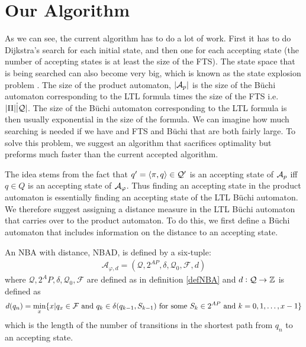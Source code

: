 \newpage
\section{Our Algorithm}
As we can see, the current algorithm has to do a lot of work. First it has to do Dijkstra's search for each initial state, and then one for each accepting state (the number of accepting states is at least the size of the FTS). The state space that is being searched can also become very big, which is known as the state explosion problem \cite{clarke99}. The size of the product automaton, $|\mathcal{A}_p|$ is the size of the B\"{u}chi automaton corresponding to the LTL formula times the size of the FTS i.e.\ $|\Pi| \dot |\mathcal{Q}|$. The size of the B\"{u}chi automaton corresponding to the LTL formula is then usually exponential in the size of the formula. We can imagine how much searching is needed if we have and FTS and B\"{u}chi that are both fairly large. To solve this problem, we suggest an algorithm that sacrifices optimality but preforms much faster than the current accepted algorithm. 

The idea stems from the fact that $q' = \langle \pi, q \rangle \in \mathcal{Q}'$ is an accepting state of $\mathcal{A}_p$ iff $q \in Q$ is an accepting state of $\mathcal{A}_\varphi$. Thus finding an accepting state in the product automaton is essentially finding an accepting state of the LTL B\"{u}chi automaton. We therefore suggest assigning a distance measure in the LTL B\"{u}chi automaton that carries over to the product automaton. To do this, we first define a B\"{u}chi automaton that includes information on the distance to an accepting state.

\begin{definition}
\label{defBWD}
An NBA with distance, NBAD, is defined by a six-tuple:
\begin{align*}
\mathcal{A}_{\varphi,d} = (\mathcal{Q},2^{AP},\delta,\mathcal{Q}_0,\mathcal{F},d)
\end{align*}
where $\mathcal{Q},2^AP,\delta,\mathcal{Q}_0,\mathcal{F}$ are defined as in definition \ref{defNBA} and $d:\mathcal{Q} \rightarrow \mathbb{Z}$ is defined as 
\begin{align*}
d(q_n) = \min_x \{x | q_x \in \mathcal{F} \text{ and } q_k \in \delta(q_{k-1},S_{k-1}) \text{ for some } S_k \in 2^{AP} \text{ and } k = 0,1,\dots, x-1 \}
\end{align*}
which is the length of the number of transitions in the shortest path from $q_n$ to an accepting state.
\end{definition}

